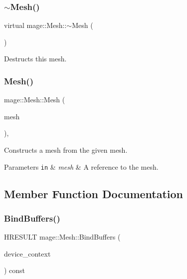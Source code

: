 \subsubsection{\texorpdfstring{$\sim$\+Mesh()}{~Mesh()}}
{\footnotesize\ttfamily virtual mage\+::\+Mesh\+::$\sim$\+Mesh (\begin{DoxyParamCaption}{ }\end{DoxyParamCaption})\hspace{0.3cm}{\ttfamily [virtual]}}

Destructs this mesh. \hypertarget{classmage_1_1_mesh_a1627e85c72d10bdedbfbf746b108cc73}{}\label{classmage_1_1_mesh_a1627e85c72d10bdedbfbf746b108cc73} 
\subsubsection{\texorpdfstring{Mesh()}{Mesh()}\hspace{0.1cm}{\footnotesize\ttfamily [2/2]}}
{\footnotesize\ttfamily mage\+::\+Mesh\+::\+Mesh (\begin{DoxyParamCaption}\item[{const \hyperlink{classmage_1_1_mesh}{Mesh} \&}]{mesh }\end{DoxyParamCaption})\hspace{0.3cm}{\ttfamily [private]}, {\ttfamily [delete]}}

Constructs a mesh from the given mesh.


\begin{DoxyParams}[1]{Parameters}
\mbox{\tt in}  & {\em mesh} & A reference to the mesh. \\
\hline
\end{DoxyParams}


\subsection{Member Function Documentation}
\hypertarget{classmage_1_1_mesh_af1116b9b7d66aba46412af418361c5b7}{}\label{classmage_1_1_mesh_af1116b9b7d66aba46412af418361c5b7} 
\subsubsection{\texorpdfstring{Bind\+Buffers()}{BindBuffers()}}
{\footnotesize\ttfamily H\+R\+E\+S\+U\+LT mage\+::\+Mesh\+::\+Bind\+Buffers (\begin{DoxyParamCaption}\item[{\hyperlink{namespacemage_ae74f374780900893caa5555d1031fd79}{Com\+Ptr}$<$ I\+D3\+D11\+Device\+Context2 $>$}]{device\+\_\+context }\end{DoxyParamCaption}) const}

